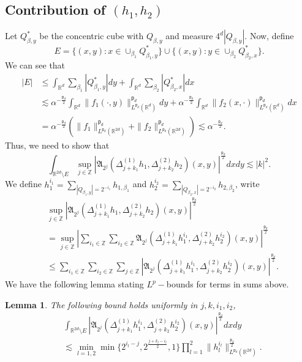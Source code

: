 \documentclass[a4paper,reqno]{amsart}
\newtheorem{lemma}[theorem]{Lemma}
\theoremstyle{definition}
\theoremstyle{remark}
\numberwithin{equation}{section}
\newcommand{\R}{{\mathbb {R}}}
\newcommand{\Z}{{\mathbb Z}}
\begin{document}
	\subsection*{Contribution of $(h_1,h_2)$} Let $Q^*_{\beta,y}$ be the concentric cube with $Q_{\beta,y}$ and measure $4^d|Q_{\beta,y}|$. Now, define
	\[E=\{(x,y):x\in\cup_{\beta_1}Q^*_{\beta_1,y}\}\cup\{(x,y):y\in\cup_{\beta_2}Q^*_{\beta_2,x}\}.\]
	We can see that
	\begin{align*}
		|E|&\leq\int_{\R^d}\sum_{\beta_1}|Q^*_{\beta_1,y}|dy+\int_{\R^d}\sum_{\beta_2}|Q^*_{\beta_2,x}|dx\\
		&\lesssim\alpha^{-\frac{\mathsf{p}_d}{2}}\int_{\R^d}\|f_1(\cdot,y)\|_{L^{{\mathsf{p}_d}}(\R^d)}^{\mathsf{p}_d}dy+\alpha^{-\frac{\mathsf{p}_d}{2}}\int_{\R^d}\|f_2(x,\cdot)\|_{L^{{\mathsf{p}_d}}(\R^d)}^{\mathsf{p}_d}dx\\
		&=\alpha^{-\frac{\mathsf{p}_d}{2}}\left(\|f_1\|_{L^{{\mathsf{p}_d}}(\R^{2d})}^{\mathsf{p}_d}+\|f_2\|_{L^{{\mathsf{p}_d}}(\R^{2d})}^{\mathsf{p}_d}\right)\lesssim\alpha^{-\frac{\mathsf{p}_d}{2}}.
	\end{align*}
	Thus, we need to show that
	\begin{equation}\label{weakbad}
		\int_{\R^{2d}\setminus E}\sup_{j\in\Z}\left|\mathfrak{A}_{2^j}(\Delta_{j+k_1}^{(1)}h_1,\Delta_{j+k_2}^{(2)}h_2)(x,y)\right|^\frac{\mathsf{p}_d}{2}dxdy\lesssim|{k}|^2.
	\end{equation}
	We define $h_1^{i_1}=\sum\limits_{|Q_{\beta_1,y}|=2^{-i_1}}h_{1,\beta_1}$ and $h_2^{i_2}=\sum\limits_{|Q_{\beta_2,x}|=2^{-i_2}}h_{2,\beta_2}$, write
	\begin{align*}
		&\sup_{j\in\Z}\left|\mathfrak{A}_{2^j}(\Delta_{j+k_1}^{(1)}h_1,\Delta_{j+k_2}^{(2)}h_2)(x,y)\right|^\frac{\mathsf{p}_d}{2}\\&=\sup_{j\in\Z}\left|\sum_{i_1\in\Z}\sum_{i_2\in\Z}\mathfrak{A}_{2^j}(\Delta_{j+k_1}^{(1)}h_1^{i_1},\Delta_{j+k_2}^{(2)}h_2^{i_2})(x,y)\right|^\frac{\mathsf{p}_d}{2}\\        &\leq\sum_{i_1\in\Z}\sum_{i_2\in\Z}\sum_{j\in\Z}\left|\mathfrak{A}_{2^j}(\Delta_{j+k_1}^{(1)}h_1^{i_1},\Delta_{j+k_2}^{(2)}h_2^{i_2})(x,y)\right|^\frac{\mathsf{p}_d}{2}.
	\end{align*}
	We have the following lemma stating $L^p-$bounds for terms in sums above. 
	\begin{lemma}
		The following bound holds uniformly in $j,{k},i_1,i_2$,
		\begin{align*}
			&\int_{\R^{2d}\setminus E}\left|\mathfrak{A}_{2^j}(\Delta_{j+k_1}^{(1)}h_1^{i_1},\Delta_{j+k_2}^{(2)}h_2^{i_2})(x,y)\right|^\frac{\mathsf{p}_d}{2}dxdy\\&\lesssim\min_{l=1,2}\min\{2^{i_l-j},2^{\frac{j+k_l-i_l}{2}},1\}\prod_{l=1}^2\|h_l^{i_l}\|_{L^{{\mathsf{p}_d}}(\R^{2d})}^\frac{\mathsf{p}_d}{2}.
		\end{align*}
	\end{lemma}
\end{document}
